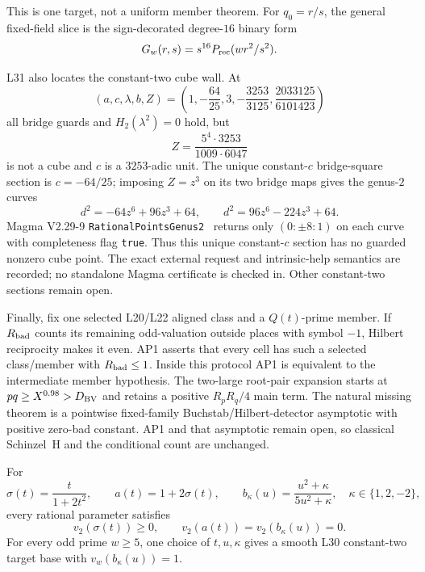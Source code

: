 This is one target, not a uniform member theorem.  For \(q_0=r/s\), the
general fixed-field slice is the sign-decorated degree-\(16\) binary
form
\[
G_w(r,s)=s^{16}P_{\rm rec}(wr^2/s^2).
\]

L31 also locates the constant-two cube wall.  At
\[
(a,c,\lambda,b,Z)
=\left(1,-\frac{64}{25},3,-\frac{3253}{3125},
\frac{2033125}{6101423}\right)
\]
all bridge guards and \(H_2(\lambda^2)=0\) hold, but
\[
Z=\frac{5^4\cdot3253}{1009\cdot6047}
\]
is not a cube and \(c\) is a \(3253\)-adic unit.  The unique
constant-\(c\) bridge-square section is \(c=-64/25\); imposing
\(Z=z^3\) on its two bridge maps gives the genus-\(2\) curves
\[
d^2=-64z^6+96z^3+64,\qquad
d^2=96z^6-224z^3+64.
\]
Magma V2.29-9 \texttt{RationalPointsGenus2}~\cite{magma} returns only
\((0:\pm8:1)\) on each curve with completeness flag \texttt{true}.
Thus this unique constant-\(c\) section has no guarded nonzero cube
point.  The exact external request and intrinsic-help semantics are
recorded; no standalone Magma certificate is checked in.  Other
constant-two sections remain open.

Finally, fix one selected L20/L22 aligned class and a \(Q(t)\)-prime
member.  If \(R_{\rm bad}\) counts its remaining odd-valuation outside
places with symbol \(-1\), Hilbert reciprocity makes it even.  AP1
asserts that every cell has such a selected class/member with
\(R_{\rm bad}\le1\).  Inside this protocol AP1 is equivalent to the
intermediate member hypothesis.  The two-large root-pair
expansion starts at \(pq\ge X^{0.98}>D_{\rm BV}\) and retains a
positive \(R_pR_q/4\) main term.  The natural missing theorem is a
pointwise fixed-family Buchstab/Hilbert-detector asymptotic with
positive zero-bad constant.  AP1 and that asymptotic remain open, so
classical Schinzel~H and the conditional count are unchanged.

\begin{theorem}
\label{thm:l32maps}
For
\[
\sigma(t)=\frac{t}{1+2t^2},\qquad
a(t)=1+2\sigma(t),\qquad
b_\kappa(u)=\frac{u^2+\kappa}{5u^2+\kappa},
\quad\kappa\in\{1,2,-2\},
\]
every rational parameter satisfies
\[
v_2(\sigma(t))\ge0,\qquad
v_2(a(t))=v_2(b_\kappa(u))=0.
\]
For every odd prime \(w\ge5\), one choice of \(t,u,\kappa\) gives a
smooth L30 constant-two target base with \(v_w(b_\kappa(u))=1\).
\end{theorem}

